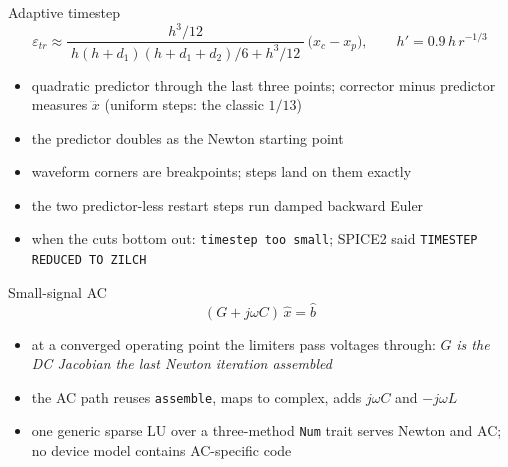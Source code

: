 \documentclass[11pt, aspectratio=169]{beamer}
\begin{document}
\begin{frame}{Adaptive timestep}
\[
\varepsilon_{tr} \approx
\frac{h^3/12}{\;h(h+d_1)(h+d_1+d_2)/6 + h^3/12\;}\,\bigl(x_c - x_p\bigr),
\qquad h' = 0.9\, h\, r^{-1/3}
\]
\vspace{1mm}
\begin{itemize}
\item quadratic predictor through the last three points; corrector minus
      predictor measures $\dddot{x}$ (uniform steps: the classic $1/13$)
\item the predictor doubles as the Newton starting point
\item waveform corners are breakpoints; steps land on them exactly
\item the two predictor-less restart steps run damped backward Euler
\item when the cuts bottom out: \texttt{timestep too small}; SPICE2 said
      \texttt{TIMESTEP REDUCED TO ZILCH}
\end{itemize}
\end{frame}

\begin{frame}{Small-signal AC}
\[
(G + j\omega C)\,\hat{x} = \hat{b}
\]
\vspace{1mm}
\begin{itemize}
\item at a converged operating point the limiters pass voltages through:
      $G$ \emph{is the DC Jacobian the last Newton iteration assembled}
\item the AC path reuses \texttt{assemble}, maps to complex, adds
      $j\omega C$ and $-j\omega L$
\item one generic sparse LU over a three-method \texttt{Num} trait serves
      Newton and AC; no device model contains AC-specific code
\end{itemize}
\end{frame}
\end{document}
